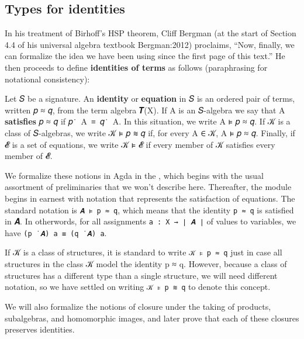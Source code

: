 \documentclass[a4paper,USenglish,cleveref,autoref,thm-restate]{lipics-v2019}
\begin{document}
\subsection{Types for identities}\label{sec:types-for-identities}
In his treatment of Birhoff's HSP theorem, Cliff Bergman (at the start of Section 4.4 of his universal algebra textbook Bergman:2012) proclaims, ``Now, finally, we can formalize the idea we have been using since the first page of this text.'' He then proceeds to define \textbf{identities of terms} as follows (paraphrasing for notational consistency):

Let 𝑆 be a signature. An \textbf{identity} or \textbf{equation} in 𝑆 is an ordered pair of terms, written 𝑝 ≈ 𝑞, from the term algebra 𝑻(X). If A is an 𝑆-algebra we say that A \textbf{satisfies} 𝑝 ≈ 𝑞 if 𝑝~̇~A~≡~𝑞~̇~A. In this situation, we write A ⊧ 𝑝 ≈ 𝑞.
If 𝒦 is a class of 𝑆-algebras, we write 𝒦 ⊧ 𝑝 ≋ 𝑞 if, for every A ∈ 𝒦, A ⊧ 𝑝 ≈ 𝑞. Finally, if 𝓔 is a set of equations, we write 𝒦 ⊧ 𝓔 if every member of 𝒦 satisfies every member of 𝓔.

We formalize these notions in Agda in the \closuremodule, which begins with the usual assortment of preliminaries that we won't describe here.  Thereafter, the module begins in earnest with
notation that represents the satisfaction of equations. The standard notation is \texttt{𝑨\ ⊧\ p\ ≈\ q}, which means that the identity \texttt{p\ ≈\ q} is satisfied in 𝑨. In otherwords, for all assignments \texttt{a\ :\ X\ →\ ∣\ 𝑨\ ∣} of values to variables, we have \texttt{(p\ ̇\ 𝑨)\ a\ ≡\ (q\ ̇\ 𝑨)\ a}.

If 𝒦 is a class of structures, it is standard to write \texttt{𝒦\ ⊧\ p\ ≈\ q} just in case all structures in the class 𝒦 model the identity p ≈ q. However, because a class of structures has a different type than a single structure, we will need different notation, so we have settled on writing \texttt{𝒦\ ⊧\ p\ ≋\ q} to denote this concept.

We will also formalize the notions of closure under the taking of products, subalgebras, and homomorphic images, and later prove that each of these closures preserves identities.
\begin{code}\end{code}
\end{document}
